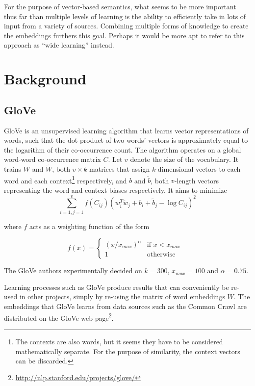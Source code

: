 \documentclass[letterpaper]{article}
\begin{document}
For the purpose of vector-based semantics, what seems to be more important thus
far than multiple levels of learning is the ability to efficiently take in lots
of input from a variety of sources. Combining multiple forms of knowledge to
create the embeddings furthers this goal. Perhaps it would be more apt to refer
to this approach as ``wide learning'' instead.

\section{Background}

\subsection{GloVe}

GloVe \cite{pennington2014glove} is an unsupervised learning algorithm that
learns vector representations of words, such that the dot product of two words'
vectors is approximately equal to the logarithm of their co-occurrence count.
The algorithm operates on a global word-word co-occurrence matrix $C$. Let $v$
denote the size of the vocabulary. It trains $W$ and $\tilde{W}$, both $v
\times k$ matrices that assign $k$-dimensional vectors to each word and each
context\footnote{The contexts are also words, but it seems they have to be
considered mathematically separate. For the purpose of similarity, the
context vectors can be discarded.} respectively, and $b$ and $\tilde{b}$, both
$v$-length vectors representing the word and context biases respectively. It
aims to minimize
$$
\sum_{i=1,j=1}^v
  f \left( C_{ij} \right)
  \left( w_i^T \tilde{w}_j + b_i + \tilde{b}_j - \log{C_{ij}} \right)^2
$$

where $f$ acts as a weighting function of the form

$$
f \left( x \right) =
  \begin{cases}
    \left( x / x_{max} \right)^\alpha & \text{if $x < x_{max}$ } \\
    1 & \text{otherwise}
  \end{cases}
$$

The GloVe authors experimentally decided on $k=300$, $x_{max}=100$ and
$\alpha=0.75$.

Learning processes such as GloVe produce results that can conveniently be
re-used in other projects, simply by re-using the matrix of word embeddings $W$.
The embeddings that GloVe learns from data sources such as the Common Crawl are
distributed on the GloVe web
page\footnote{\url{http://nlp.stanford.edu/projects/glove/}}.
\end{document}
